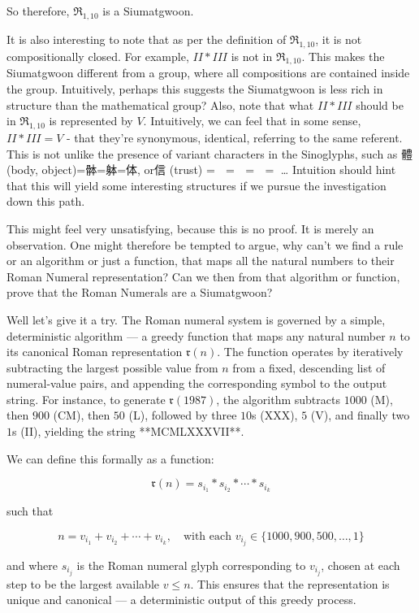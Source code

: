 So therefore, $\mathfrak{R}_{1,10}$ is a Siumatgwoon. 

It is also interesting to note that as per the definition of $\mathfrak{R}_{1,10}$, it is not compositionally closed. For example, $II * III$ is not in $\mathfrak{R}_{1,10}$. This makes the Siumatgwoon different from a group, where all compositions are contained inside the group. Intuitively, perhaps this suggests the Siumatgwoon is less rich in structure than the mathematical group? Also, note that what $II * III$ should be in $\mathfrak{R}_{1,10}$ is represented by $V$. Intuitively, we can feel that in some sense, $II * III = V$ - that they're synonymous, identical, referring to the same referent. This is not unlike the presence of variant characters in the Sinoglyphs, such as 體 (body, object)=骵=躰=体, or信 (trust) = 𬢭 = 伩 = 訫 = 㐰… Intuition should hint that this will yield some interesting structures if we pursue the investigation down this path.

This might feel very unsatisfying, because this is no proof. It is merely an observation. One might therefore be tempted to argue, why can't we find a rule or an algorithm or just a function, that maps all the natural numbers to their Roman Numeral representation? Can we then from that algorithm or function, prove that the Roman Numerals are a Siumatgwoon?


Well let's give it a try. The Roman numeral system is governed by a simple, deterministic algorithm — a greedy function that maps any natural number $n$ to its canonical Roman representation $\mathfrak{r}(n)$. The function operates by iteratively subtracting the largest possible value from $n$ from a fixed, descending list of numeral-value pairs, and appending the corresponding symbol to the output string. For instance, to generate $\mathfrak{r}(1987)$, the algorithm subtracts $1000$ (M), then $900$ (CM), then $50$ (L), followed by three $10$s (XXX), $5$ (V), and finally two $1$s (II), yielding the string **MCMLXXXVII**.

We can define this formally as a function:

$$
\mathfrak{r}(n) = s_{i_1} * s_{i_2} * \cdots * s_{i_k}
$$

such that

$$
n = v_{i_1} + v_{i_2} + \cdots + v_{i_k}, \quad \text{with each } v_{i_j} \in \{1000, 900, 500, \ldots, 1\}
$$

and where $s_{i_j}$ is the Roman numeral glyph corresponding to $v_{i_j}$, chosen at each step to be the largest available $v \leq n$. This ensures that the representation is unique and canonical — a deterministic output of this greedy process.

